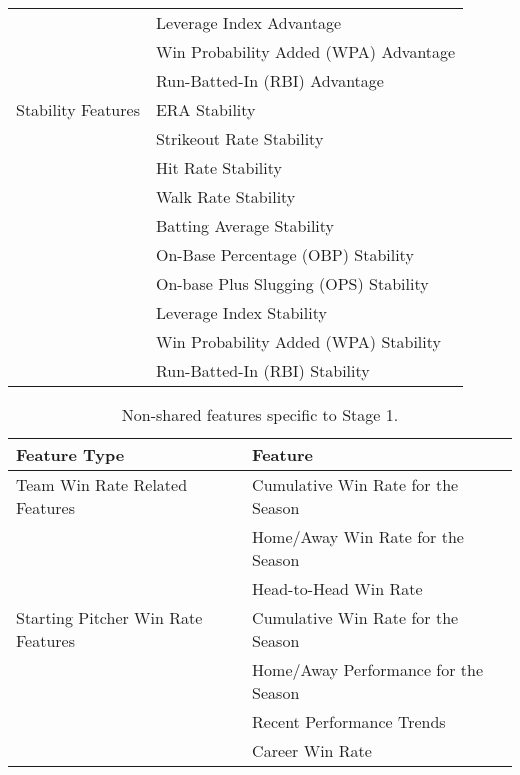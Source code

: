 \documentclass[12pt,a4paper]{article}
\begin{document}
\begin{longtable}{p{} p{}}
                                & Leverage Index Advantage                    \\
                                & Win Probability Added (WPA) Advantage       \\
                                & Run-Batted-In (RBI) Advantage               \\
Stability Features             & ERA Stability                              \\
                                & Strikeout Rate Stability                    \\
                                & Hit Rate Stability                          \\
                                & Walk Rate Stability                         \\
                                & Batting Average Stability                   \\
                                & On-Base Percentage (OBP) Stability          \\
                                & On-base Plus Slugging (OPS) Stability       \\
                                & Leverage Index Stability                    \\
                                & Win Probability Added (WPA) Stability       \\
                                & Run-Batted-In (RBI) Stability               \\
\end{longtable}

\begin{table}[h!]
\centering
\small
\begin{tabular}{p{} p{}}
\toprule
\textbf{Feature Type}          & \textbf{Feature}                            \\
\midrule
Team Win Rate Related Features & Cumulative Win Rate for the Season          \\
                                & Home/Away Win Rate for the Season           \\
                                & Head-to-Head Win Rate                       \\
Starting Pitcher Win Rate Features & Cumulative Win Rate for the Season          \\
                                & Home/Away Performance for the Season        \\
                                & Recent Performance Trends                   \\
                                & Career Win Rate                             \\
\bottomrule
\end{tabular}
\caption{Non-shared features specific to Stage 1.}
\label{tab:non_shared_stage1}
\end{table}
\end{document}
